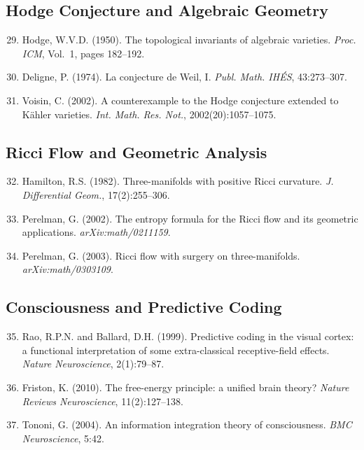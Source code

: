 \documentclass[12pt, openany]{book}
\theoremstyle{remark}
\begin{document}
\subsection*{Hodge Conjecture and Algebraic Geometry}

\begin{enumerate}\setcounter{enumi}{28}

\item Hodge, W.V.D. (1950). The topological invariants of algebraic varieties.
      \emph{Proc. ICM}, Vol.~1, pages 182--192.

\item Deligne, P. (1974). La conjecture de Weil, I. \emph{Publ. Math. IH\'ES},
      43:273--307.

\item Voisin, C. (2002). A counterexample to the Hodge conjecture extended to
      K\"ahler varieties. \emph{Int. Math. Res. Not.}, 2002(20):1057--1075.

\end{enumerate}

\subsection*{Ricci Flow and Geometric Analysis}

\begin{enumerate}\setcounter{enumi}{31}

\item Hamilton, R.S. (1982). Three-manifolds with positive Ricci curvature.
      \emph{J. Differential Geom.}, 17(2):255--306.

\item Perelman, G. (2002). The entropy formula for the Ricci flow and its
      geometric applications. \emph{arXiv:math/0211159}.

\item Perelman, G. (2003). Ricci flow with surgery on three-manifolds.
      \emph{arXiv:math/0303109}.

\end{enumerate}

\subsection*{Consciousness and Predictive Coding}

\begin{enumerate}\setcounter{enumi}{34}

\item Rao, R.P.N. and Ballard, D.H. (1999). Predictive coding in the visual
      cortex: a functional interpretation of some extra-classical
      receptive-field effects. \emph{Nature Neuroscience}, 2(1):79--87.

\item Friston, K. (2010). The free-energy principle: a unified brain theory?
      \emph{Nature Reviews Neuroscience}, 11(2):127--138.

\item Tononi, G. (2004). An information integration theory of consciousness.
      \emph{BMC Neuroscience}, 5:42.

\end{enumerate}
\end{document}

